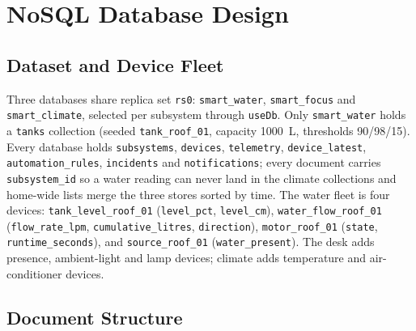 \documentclass[11pt,a4paper]{article}
\begin{document}
\section{NoSQL Database Design}

\subsection{Dataset and Device Fleet}

Three databases share replica set \texttt{rs0}: \texttt{smart\_water}, \texttt{smart\_focus} and \texttt{smart\_climate}, selected per subsystem through \texttt{useDb}. Only \texttt{smart\_water} holds a \texttt{tanks} collection (seeded \texttt{tank\_roof\_01}, capacity 1000~L, thresholds 90/98/15). Every database holds \texttt{subsystems}, \texttt{devices}, \texttt{telemetry}, \texttt{device\_latest}, \texttt{automation\_rules}, \texttt{incidents} and \texttt{notifications}; every document carries \texttt{subsystem\_id} so a water reading can never land in the climate collections and home-wide lists merge the three stores sorted by time. The water fleet is four devices: \texttt{tank\_level\_roof\_01} (\texttt{level\_pct}, \texttt{level\_cm}), \texttt{water\_flow\_roof\_01} (\texttt{flow\_rate\_lpm}, \texttt{cumulative\_litres}, \texttt{direction}), \texttt{motor\_roof\_01} (\texttt{state}, \texttt{runtime\_seconds}), and \texttt{source\_roof\_01} (\texttt{water\_present}). The desk adds presence, ambient-light and lamp devices; climate adds temperature and air-conditioner devices.

\subsection{Document Structure}
\end{document}
